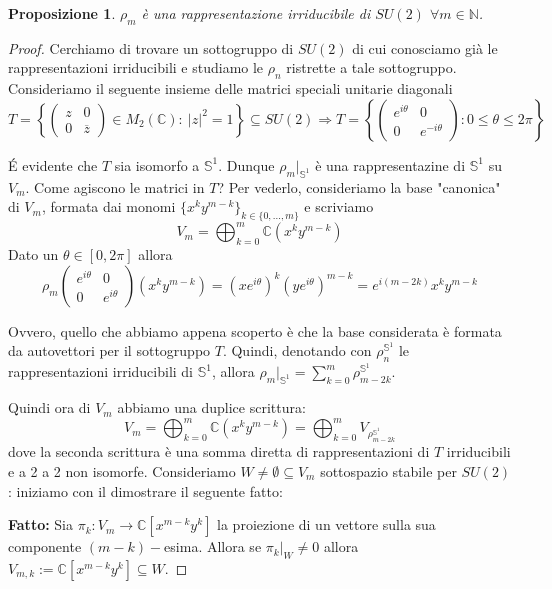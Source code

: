 \documentclass[11pt]{article}
\theoremstyle{plain}
\newtheorem{prop}[thm]{Proposizione}
\theoremstyle{definition}
\theoremstyle{remark}
\newcommand{\C}{\mathbb{C}}
\newcommand{\N}{\mathbb{N}}
\begin{document}
\begin{prop} $\rho_m$ è una rappresentazione irriducibile di $SU(2)$ $\forall m\in \N$.
\label{prop:irrid su2}
\end{prop}
\begin{proof} Cerchiamo di trovare un sottogruppo di $SU(2)$ di cui conosciamo già le rappresentazioni irriducibili e studiamo le $\rho_n$ ristrette a tale sottogruppo. Consideriamo il seguente insieme delle matrici speciali unitarie diagonali
\[T=
\left\{\begin{pmatrix}
z & 0\\ 
 0& \overline{z}
\end{pmatrix}\in M_2(\C):\ |z|^2=1 \right\}\subseteq SU(2)\Rightarrow T= \left\{\begin{pmatrix}
e^{i\theta}& 0\\ 
 0& e^{-i\theta}
\end{pmatrix}: 0\leq \theta \leq 2\pi \right\}\]

\'E evidente che $T$ sia isomorfo a $\mathbb{S}^1$. Dunque $\rho_m|_{\mathbb{S}^1}$ è una rappresentazine di $\mathbb{S}^1$ su $V_m$. Come agiscono le matrici in $T$? Per vederlo, consideriamo la base "canonica" di $V_m$, formata dai monomi $\{ x^ky^{m-k} \}_{k \in \{0, ..., m\}}$ e scriviamo
\[V_m=\bigoplus_{k=0}^m \C (x^k y^{m-k})\]
Dato un $\theta\in [0,2\pi]$ allora
\[\rho_m\begin{pmatrix}
e^{i\theta} & 0\\ 
 0& e^{i\theta}
\end{pmatrix} (x^ky^{m-k}) = (xe^{i\theta})^k(ye^{i\theta})^{m-k}=e^{i(m-2k)} x^k y^{m-k} \]

Ovvero, quello che abbiamo appena scoperto è che la base considerata è formata da autovettori per il sottogruppo $T$. Quindi, denotando con $\rho_n^{\mathbb{S}^1}$ le rappresentazioni irriducibili di $\mathbb{S}^1$, allora $\rho_m|_{\mathbb{S}^1}=\sum_{k=0}^{m}\rho_{m-2k}^{\mathbb{S}^1}$.

Quindi ora di $V_m$ abbiamo una duplice scrittura:
\[V_m=\bigoplus_{k=0}^m \C (x^k y^{m-k})=\bigoplus_{k=0}^m V_{\rho_{m-2k}^{\mathbb{S}^1}}\]
dove la seconda scrittura è una somma diretta di rappresentazioni di $T$ irriducibili e a 2 a 2 non isomorfe. Consideriamo $W\neq \emptyset \subseteq V_m$ sottospazio stabile per $SU(2)$: iniziamo con il dimostrare il seguente fatto:

\textbf{Fatto:} Sia $\pi_k:V_m\rightarrow \C [x^{m-k}y^k]$ la proiezione di un vettore sulla sua componente $(m-k)-$esima. Allora se $\pi_k|_W\neq 0$ allora $V_{m,k}:=\C[ x^{m-k}y^k]\subseteq W$.


\end{proof}
\end{document}
